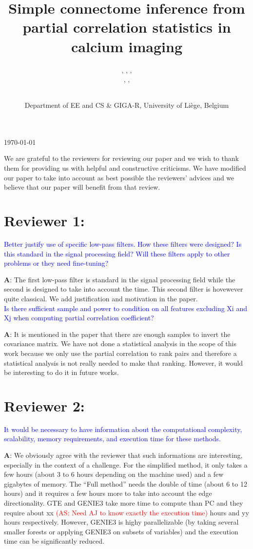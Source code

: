 \documentclass[wcp]{jmlr}
\title{Simple connectome inference from partial correlation statistics in calcium imaging}
\author{\Name{Antonio Sutera},
   \Name{Arnaud Joly},
   \Name{Vincent François-Lavet}, \Email{a.sutera@ulg.ac.be}\\
   \Name{Zixiao Aaron Qiu},
   \Name{Gilles Louppe},
   \Name{Damien Ernst}\and\Name{Pierre Geurts}
    \\
   \addr Department of EE and CS \& GIGA-R, University of Li\`ege, Belgium}
\begin{document}
\maketitle
\begin{center}
\vspace{-1.5cm}
\today
\end{center}

We are grateful to the reviewers for reviewing our paper and we wish to thank them for providing us with helpful and constructive criticisms.
We have modified our paper to take into account as best possible the reviewers' advices and we believe that our paper will benefit from that review. 


\section*{Reviewer 1:}
\textcolor{blue}{
Better justify use of specific low-pass filters. How these filters were designed? Is this standard in the signal processing field? Will these filters apply to other problems or they need fine-tuning?}

\textbf{A}: The first low-pass filter is standard in the signal processing field while the second is designed to take into account the time. This second filter is hovewever quite classical. We add justification and motivation in the paper.\\

\noindent
\textcolor{blue}{Is there sufficient sample and power to condition on all features excluding Xi and Xj when computing partial correlation coefficient?}

\textbf{A}: It is mentioned in the paper that there are enough samples to invert the covariance matrix. We have not done a statistical analysis in the scope of this work because we only use the partial correlation to rank pairs and therefore a statistical analysis is not really needed to make that ranking. However, it would be interesting to do it in future works.

\section*{Reviewer 2:}

\textcolor{blue}{It would be necessary to have information about the computational complexity, scalability, memory requirements, and execution time for these methods.}

\textbf{A}: We obviously agree with the reviewer that such informations are interesting, especially in the context of a challenge. For the simplified method, it only takes a few hours (about 3 to 6 hours depending on the machine used) and a few gigabytes of memory. The ``Full method'' needs the double of time (about 6 to 12 hours) and it requires a few hours more to take into account the edge directionality. GTE and GENIE3 take more time to compute than PC and they require about xx \textcolor{red}{(AS: Need AJ to know exactly the execution time)} hours and yy hours respectively. However, GENIE3 is highy parallelizable (by taking several smaller forests or applying GENIE3 on subsets of variables) and the execution time can be significantly reduced.
\end{document}
